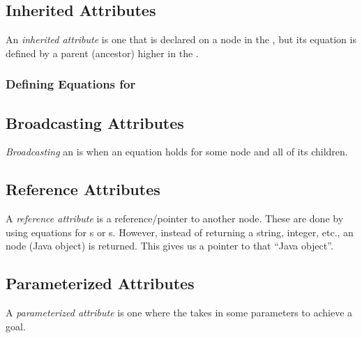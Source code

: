 \subsection{Inherited Attributes}\label{subsec:Inherited_Attributes}
\begin{definition}\label{def:Inherited_Attribute}
  An \emph{inherited attribute} is one that is declared on a node in the , but its equation is defined by a parent (ancestor) higher in the .
\end{definition}

\subsubsection{Defining Equations for }\label{subsubsec:Define_Inherited_Equations}

\subsection{Broadcasting Attributes}\label{subsec:Broadcasting_Attributes}
\begin{definition}[Broadcasting]\label{def:Broadcasting}
  \emph{Broadcasting} an  is when an equation holds for some node and all of its children.
\end{definition}

\subsection{Reference Attributes}\label{subsec:Reference_Attributes}
\begin{definition}\label{def:Reference_Attribute}
  A \emph{reference attribute} is a reference/pointer to another  node.
  These are done by using equations for s or s.
  However, instead of returning a string, integer, etc., an  node (Java object) is returned.
  This gives us a pointer to that ``Java object''.
\end{definition}

\subsection{Parameterized Attributes}\label{subsec:Parameterized_Attributes}
\begin{definition}\label{def:Parameterized_Attribute}
  A \emph{parameterized attribute} is one where the  takes in some parameters to achieve a  goal.
\end{definition}

